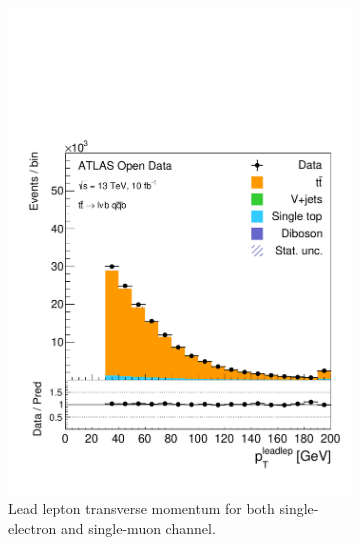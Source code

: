 \documentclass[12pt,a4paper]{article}
\numberwithin{equation}{section}
\begin{document}
\begin{figure}[t!]
    \centering
    \begin{subfigure}[t]{0.47\textwidth}
        \centering
        \includegraphics[width=1.0\textwidth]{figures/hist_leadleptpt}
        \caption{\label{fig:leppt}Lead lepton transverse momentum for both
          single-electron and single-muon channel.}
      \end{subfigure}%
      \hfill{}
    \begin{subfigure}[t]{0.47\textwidth}
      \centering

\end{subfigure}
\end{figure}
\end{document}
